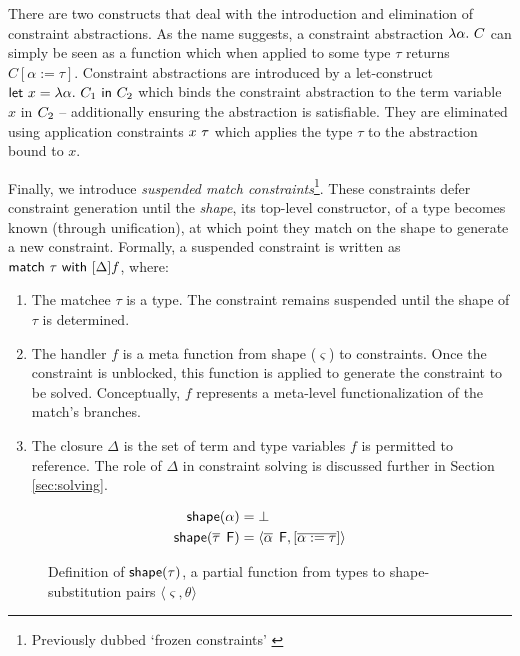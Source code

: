 \documentclass[acmsmall,screen,nonacm]{acmart}
\begin{document}
There are two constructs that deal with the introduction and elimination of constraint
abstractions. As the name suggests, a constraint abstraction $\lambda {\alpha}. ~ {C}$ can simply be seen as a
function which when applied to some type $\tau$ returns $C[\alpha := \tau]$. Constraint abstractions 
are introduced by a let-construct $\mathsf{let} ~ x = \lambda {\alpha}. ~ {C_1} ~ \mathsf{in} ~ C_2$  which binds the constraint abstraction
to the term variable $x$ in $C_2$ -- additionally ensuring the abstraction is satisfiable. They are
eliminated using application constraints ${x} ~ {\tau}$ which applies the type $\tau$ to the abstraction
bound to $x$.

Finally, we introduce \textit{suspended match constraints}\footnote{Previously dubbed `frozen constraints' \citep{TODO}}.  
These constraints defer constraint generation until the \textit{shape}, \eg its top-level constructor, of a type becomes known (through unification), at which point 
they match on the shape to generate a new constraint. Formally, a suspended constraint is written as 
$\mathsf{match} ~ \tau ~ \mathsf{with} ~ [ \Delta ] f$, where:
\begin{enumerate}
\item
  The matchee $\tau$ is a type. The constraint remains suspended until the shape of $\tau$ is determined. 
\item 
  The handler $f$ is a meta function from shape ($\varsigma$) to constraints.
  Once the constraint is unblocked, this function is applied to generate the constraint to be solved. 
  Conceptually, $f$ represents a meta-level functionalization of the match's branches.
\item
  The closure $\Delta$ is the set of term and type variables $f$ is permitted to reference. 
  The role of $\Delta$ in constraint solving is discussed further in Section \ref{sec:solving}. 
\end{enumerate}

\begin{figure}[!htpb]
  \begin{align*}
    \textsf{shape}(\alpha) &= \bot \\ 
    \textsf{shape}(\overline{\tau} \mathop{}\mathrel{\mathsf{F}}) &= \langle \overline{\alpha} \mathop{}\mathrel{\mathsf{F}}, [\overline{\alpha := \tau}] \rangle
  \end{align*} 
  \caption{Definition of $\textsf{shape}(\tau)$, a partial function from types to shape-substitution pairs $\langle \varsigma, \theta \rangle$}
  \label{fig:shape-fn-def}
\end{figure}
\end{document}
